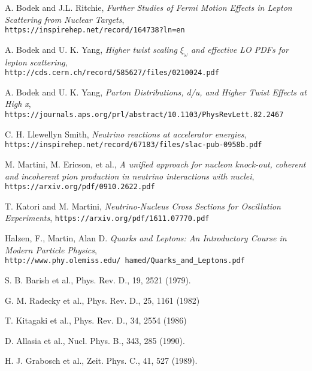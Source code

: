 \begin{thebibliography}{20}
A. Bodek and J.L. Ritchie, \emph{Further Studies of Fermi Motion Effects in Lepton Scattering from Nuclear Targets},\\
\texttt{https://inspirehep.net/record/164738?ln=en}


A. Bodek and U. K. Yang, \emph{Higher twist scaling $\xi_\omega$ and effective LO PDFs for lepton scattering},\\
\texttt{http://cds.cern.ch/record/585627/files/0210024.pdf}

A. Bodek and U. K. Yang, \emph{Parton Distributions, d/u, and Higher Twist Effects at High x},\\
\texttt{https://journals.aps.org/prl/abstract/10.1103/PhysRevLett.82.2467}

 C. H. Llewellyn Smith, \emph{Neutrino reactions at accelerator energies},
\texttt{https://inspirehep.net/record/67183/files/slac-pub-0958b.pdf}


 M. Martini, M. Ericson, et al., \emph{A unified approach for nucleon knock-out, coherent and incoherent pion production in neutrino interactions with nuclei},
\texttt{https://arxiv.org/pdf/0910.2622.pdf}


 T. Katori and M. Martini, \emph{Neutrino-Nucleus Cross Sections for Oscillation Experiments},
\texttt{https://arxiv.org/pdf/1611.07770.pdf}





Halzen, F., Martin, Alan D. \emph{Quarks and Leptons: An Introductory Course in Modern Particle Physics},\\
  \texttt{http://www.phy.olemiss.edu/~hamed/Quarks\_and\_Leptons.pdf}


  S. B. Barish et al., Phys. Rev. D., 19, 2521 (1979).

 G. M. Radecky et al., Phys. Rev. D., 25, 1161 (1982)
 
 T. Kitagaki et al., Phys. Rev. D., 34, 2554 (1986)
 
 D. Allasia et al., Nucl. Phys. B., 343, 285 (1990).

 H. J. Grabosch et al., Zeit. Phys. C., 41, 527 (1989).


\end{thebibliography}
